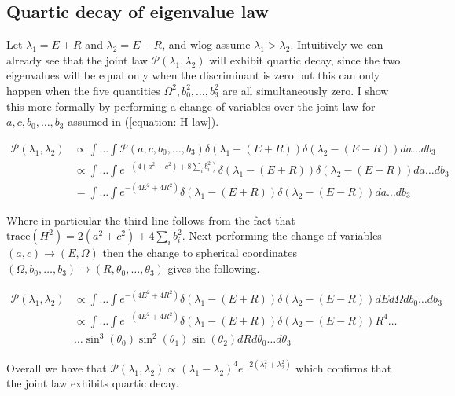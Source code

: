 \documentclass{article}
\begin{document}
\subsection*{Quartic decay of eigenvalue law}

Let $\lambda_1 = E + R$ and $\lambda_2 = E - R$, and wlog assume $\lambda_1 > \lambda_2$. Intuitively we can already see that the joint law $\mathcal{P} \left ( \lambda_1, \lambda_2 \right )$ will exhibit quartic decay, since the two eigenvalues will be equal only when the discriminant is zero but this can only happen when the five quantities $\Omega^2, b_0^2, \dots, b_3^2$ are all simultaneously zero. I show this more formally by performing a change of variables over the joint law for $a,c,b_0, \dots, b_3$ assumed in (\ref{equation: H law}). 

\begin{align}
	\mathcal{P} \left ( \lambda_1, \lambda_2 \right ) & \propto \int \dots \int \mathcal{P} \left ( a, c, b_0, \dots, b_3 \right ) \delta \left ( \lambda_1 - (E+R) \right ) \delta \left ( \lambda_2 - (E-R) \right ) da \dots db_3 \\ 
	 & \propto \int \dots \int e^{-\left ( 4(a^2 + c^2) + 8 \sum_i b_i^2 \right )} \delta \left ( \lambda_1 - (E+R) \right ) \delta \left ( \lambda_2 - (E-R) \right ) da \dots db_3 \\ 
	 & = \int \dots \int e^{- \left ( 4E^2 + 4 R^2 \right )} \delta \left ( \lambda_1 - (E+R) \right ) \delta \left ( \lambda_2 - (E-R) \right ) da \dots db_3
\end{align}

Where in particular the third line follows from the fact that $\text{trace}(H^2) = 2(a^2 + c^2) + 4 \sum_i b_i^2$. Next performing the change of variables $(a,c) \rightarrow (E, \Omega)$ then the change to spherical coordinates $(\Omega, b_0, \dots, b_3) \rightarrow (R, \theta_0, \dots, \theta_3)$ gives the following. 

\begin{align}
	\mathcal{P} \left ( \lambda_1, \lambda_2 \right ) & \propto \int \dots \int e^{- \left ( 4E^2 + 4 R^2 \right )} \delta \left ( \lambda_1 - (E+R) \right ) \delta \left ( \lambda_2 - (E-R) \right ) dE d\Omega db_0 \dots db_3 \\ 
	& \propto  \int \dots \int e^{- \left ( 4E^2 + 4 R^2 \right )} \delta \left ( \lambda_1 - (E+R) \right ) \delta \left ( \lambda_2 - (E-R) \right ) R^4 \dots \\
	& \dots \sin^{3} (\theta_0) \sin^2 (\theta_1) \sin (\theta_2) dR d\theta_0 \dots d\theta_3 \nonumber 
\end{align}

Overall we have that $\mathcal{P} \left ( \lambda_1, \lambda_2 \right ) \propto \left ( \lambda_1 - \lambda_2 \right )^4 e^{-2 \left ( \lambda_1^2 + \lambda_2^2 \right)}$ which confirms that the joint law exhibits quartic decay. 

\newpage 



\end{document}
